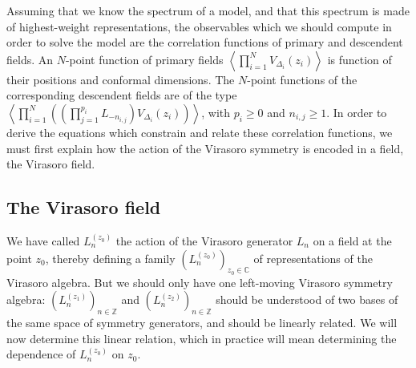 \documentclass[12pt,a4paper,notitlepage]{report}
\numberwithin{equation}{section}
\theoremstyle{break}
\begin{document}
Assuming that we know the spectrum of a model, and that this spectrum is made of highest-weight representations, the observables which we should compute in order to solve the model are the correlation functions of primary and descendent fields.
An $N$-point function of primary fields $\left\langle \prod_{i=1}^N V_{\Delta_i}(z_i) \right\rangle$ is function of their positions and conformal dimensions.
The $N$-point functions of the corresponding descendent fields are of the type $\left\langle \prod_{i=1}^N \left(\left(\prod_{j=1}^{p_i} L_{-n_{i,j}}\right)V_{\Delta_i}(z_i)\right) \right\rangle$, with $p_i\geq 0$ and $n_{i,j}\geq 1$. 
In order to derive the equations which constrain and relate these correlation functions, we must first explain how the action of the Virasoro symmetry is encoded in a field, the Virasoro field.


\subsection{The Virasoro field \label{sectvf}}

We have called $L_n^{(z_0)}$ the action of the Virasoro generator $L_n$ on a field at the point $z_0$, thereby defining a family $(L_n^{(z_0)})_{z_0\in{\mathbb{C}}}$ of representations of the Virasoro algebra.
But we should only have one left-moving Virasoro symmetry algebra: $(L_n^{(z_1)})_{n\in \mathbb{Z}}$ and $(L_n^{(z_2)})_{n\in \mathbb{Z}}$ should be understood of two bases of the same space of symmetry generators, and should be linearly related. 
We will now determine this linear relation, which in practice will mean determining the 
dependence of $L_n^{(z_0)}$ on $z_0$.
\end{document}
